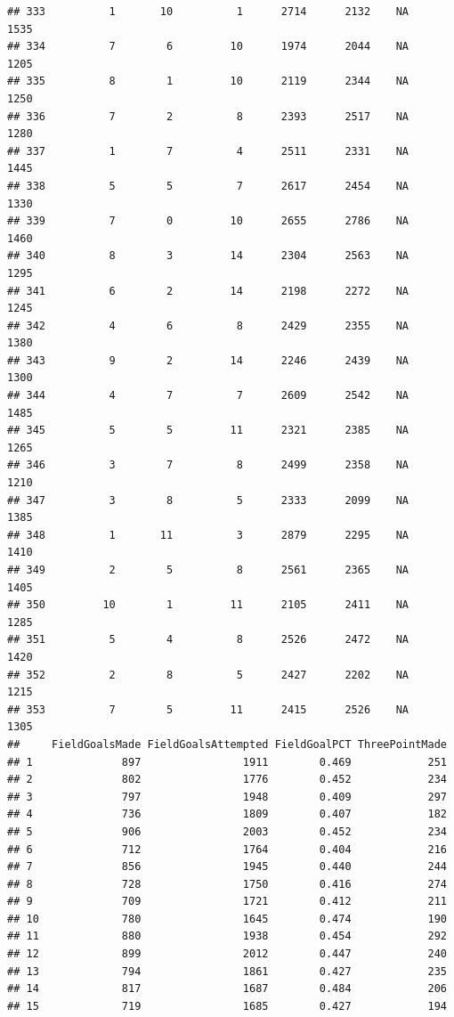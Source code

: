 \documentclass[]{book}
\begin{document}
\begin{verbatim}
## 333          1       10          1      2714      2132    NA    1535
## 334          7        6         10      1974      2044    NA    1205
## 335          8        1         10      2119      2344    NA    1250
## 336          7        2          8      2393      2517    NA    1280
## 337          1        7          4      2511      2331    NA    1445
## 338          5        5          7      2617      2454    NA    1330
## 339          7        0         10      2655      2786    NA    1460
## 340          8        3         14      2304      2563    NA    1295
## 341          6        2         14      2198      2272    NA    1245
## 342          4        6          8      2429      2355    NA    1380
## 343          9        2         14      2246      2439    NA    1300
## 344          4        7          7      2609      2542    NA    1485
## 345          5        5         11      2321      2385    NA    1265
## 346          3        7          8      2499      2358    NA    1210
## 347          3        8          5      2333      2099    NA    1385
## 348          1       11          3      2879      2295    NA    1410
## 349          2        5          8      2561      2365    NA    1405
## 350         10        1         11      2105      2411    NA    1285
## 351          5        4          8      2526      2472    NA    1420
## 352          2        8          5      2427      2202    NA    1215
## 353          7        5         11      2415      2526    NA    1305
##     FieldGoalsMade FieldGoalsAttempted FieldGoalPCT ThreePointMade
## 1              897                1911        0.469            251
## 2              802                1776        0.452            234
## 3              797                1948        0.409            297
## 4              736                1809        0.407            182
## 5              906                2003        0.452            234
## 6              712                1764        0.404            216
## 7              856                1945        0.440            244
## 8              728                1750        0.416            274
## 9              709                1721        0.412            211
## 10             780                1645        0.474            190
## 11             880                1938        0.454            292
## 12             899                2012        0.447            240
## 13             794                1861        0.427            235
## 14             817                1687        0.484            206
## 15             719                1685        0.427            194

\end{verbatim}
\end{document}
